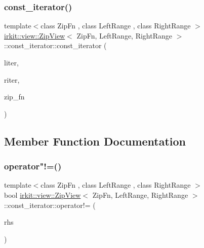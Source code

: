 \subsubsection{\texorpdfstring{const\+\_\+iterator()}{const\_iterator()}}
{\footnotesize\ttfamily template$<$class Zip\+Fn , class Left\+Range , class Right\+Range $>$ \\
\hyperlink{classirkit_1_1view_1_1ZipView}{irkit\+::view\+::\+Zip\+View}$<$ Zip\+Fn, Left\+Range, Right\+Range $>$\+::const\+\_\+iterator\+::const\+\_\+iterator (\begin{DoxyParamCaption}\item[{\hyperlink{namespaceirkit_a4b1668583041117eb42c1b5a1091b804}{const\+\_\+iterator\+\_\+t}$<$ Left\+Range $>$}]{liter,  }\item[{\hyperlink{namespaceirkit_a4b1668583041117eb42c1b5a1091b804}{const\+\_\+iterator\+\_\+t}$<$ Right\+Range $>$}]{riter,  }\item[{Zip\+Fn}]{zip\+\_\+fn }\end{DoxyParamCaption})\hspace{0.3cm}{\ttfamily [inline]}}



\subsection{Member Function Documentation}
\mbox{\label{classirkit_1_1view_1_1ZipView_1_1const__iterator_ad4c15fc5387d6453fc25e7b0232e10ac}} 
\subsubsection{\texorpdfstring{operator"!=()}{operator!=()}}
{\footnotesize\ttfamily template$<$class Zip\+Fn , class Left\+Range , class Right\+Range $>$ \\
bool \hyperlink{classirkit_1_1view_1_1ZipView}{irkit\+::view\+::\+Zip\+View}$<$ Zip\+Fn, Left\+Range, Right\+Range $>$\+::const\+\_\+iterator\+::operator!= (\begin{DoxyParamCaption}\item[{const \hyperlink{classirkit_1_1view_1_1ZipView_1_1const__iterator}{const\+\_\+iterator} \&}]{rhs }\end{DoxyParamCaption})\hspace{0.3cm}{\ttfamily [inline]}}

